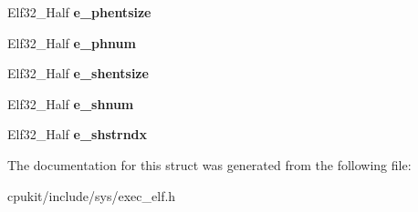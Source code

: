 \begin{DoxyCompactItemize}
\item 
\mbox{\label{structElf32__Ehdr_afa2289f96d86fcc568a3b1f40cc8953e}} 
Elf32\+\_\+\+Half {\bfseries e\+\_\+phentsize}
\item 
\mbox{\label{structElf32__Ehdr_a360898812db1655f8cb8258780d9df5b}} 
Elf32\+\_\+\+Half {\bfseries e\+\_\+phnum}
\item 
\mbox{\label{structElf32__Ehdr_ab53c709a841960e499da68e2316ed428}} 
Elf32\+\_\+\+Half {\bfseries e\+\_\+shentsize}
\item 
\mbox{\label{structElf32__Ehdr_a11249bd7e61642742a68a3e7f69ac721}} 
Elf32\+\_\+\+Half {\bfseries e\+\_\+shnum}
\item 
\mbox{\label{structElf32__Ehdr_a3b3070ccd7d971e8cb6ea58d4c6fab09}} 
Elf32\+\_\+\+Half {\bfseries e\+\_\+shstrndx}
\end{DoxyCompactItemize}


The documentation for this struct was generated from the following file\+:\begin{DoxyCompactItemize}
\item 
cpukit/include/sys/exec\+\_\+elf.\+h\end{DoxyCompactItemize}
